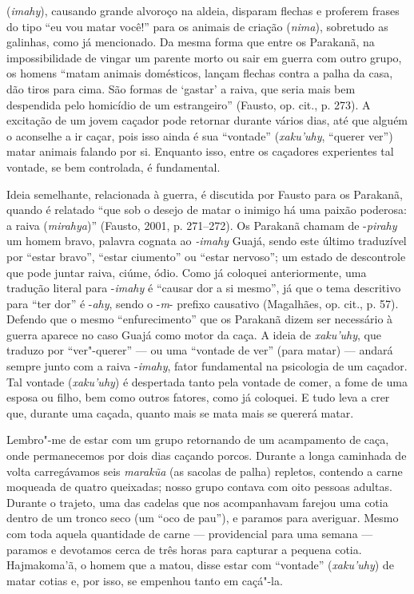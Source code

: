 (\emph{imahy}), causando grande alvoroço na aldeia, disparam flechas e
proferem frases do tipo ``eu vou matar você!'' para os animais de criação
(\emph{nima}), sobretudo as galinhas, como já mencionado. Da mesma forma
que entre os Parakanã, na impossibilidade de vingar um parente morto ou
sair em guerra com outro grupo, os homens ``matam animais domésticos,
lançam flechas contra a palha da casa, dão tiros para cima. São formas
de `gastar' a raiva, que seria mais bem despendida pelo homicídio de um
estrangeiro'' (Fausto, op. cit., p. 273). A excitação de um jovem caçador
pode retornar durante vários dias, até que alguém o aconselhe a ir
caçar, pois isso ainda é sua ``vontade'' (\emph{xaku'uhy}, ``querer ver'')
matar animais falando por si. Enquanto isso, entre os caçadores
experientes tal vontade, se bem controlada, é fundamental.

Ideia semelhante, relacionada à guerra, é discutida por Fausto para os
Parakanã, quando é relatado ``que sob o desejo de matar o inimigo há uma
paixão poderosa: a raiva (\emph{mirahya})'' (Fausto, 2001, p. 271--272).
Os Parakanã chamam de -\emph{pirahy} um homem bravo, palavra cognata ao
\emph{-imahy} Guajá, sendo este último traduzível por ``estar bravo'',
``estar ciumento'' ou ``estar nervoso''; um estado de descontrole que pode
juntar raiva, ciúme, ódio. Como já coloquei anteriormente, uma tradução
literal para -\emph{imahy} é ``causar dor a si mesmo'', já que o tema
descritivo para ``ter dor'' é -\emph{ahy}, sendo o -\emph{m}- prefixo
causativo (Magalhães, op. cit., p. 57). Defendo que o mesmo
``enfurecimento'' que os Parakanã dizem ser necessário à guerra aparece no
caso Guajá como motor da caça. A ideia de \emph{xaku'uhy}, que traduzo
por ``ver"-querer'' --- ou uma ``vontade de ver'' (para matar) --- andará sempre
junto com a raiva -\emph{imahy}, fator fundamental na psicologia de um
caçador. Tal vontade (\emph{xaku'uhy}) é despertada tanto pela vontade
de comer, a fome de uma esposa ou filho, bem como outros fatores, como
já coloquei. E tudo leva a crer que, durante uma caçada, quanto mais se
mata mais se quererá matar.

Lembro"-me de estar com um grupo retornando de um acampamento de caça,
onde permanecemos por dois dias caçando porcos. Durante a longa
caminhada de volta carregávamos seis \emph{marakũa} (as sacolas de
palha) repletos, contendo a carne moqueada de quatro queixadas; nosso
grupo contava com oito pessoas adultas. Durante o trajeto, uma das
cadelas que nos acompanhavam farejou uma cotia dentro de um tronco seco
(um ``oco de pau''), e paramos para averiguar. Mesmo com toda aquela
quantidade de carne --- providencial para uma semana --- paramos e devotamos
cerca de três horas para capturar a pequena cotia. Hajmakoma'ã, o homem
que a matou, disse estar com ``vontade'' (\emph{xaku'uhy}) de matar cotias
e, por isso, se empenhou tanto em caçá"-la.

